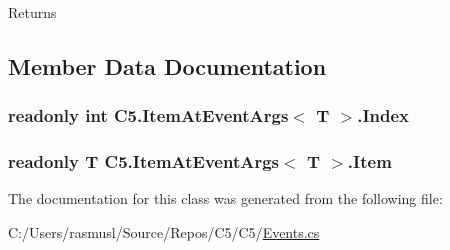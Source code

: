 \begin{DoxyReturn}{Returns}

\end{DoxyReturn}


\subsection{Member Data Documentation}
\hypertarget{class_c5_1_1_item_at_event_args_a6e28d2322e9f3a0b938763edf392a5d6}{}
\subsubsection[{Index}]{\setlength{\rightskip}{0pt plus 5cm}readonly int {\bf C5.\+Item\+At\+Event\+Args}$<$ T $>$.Index}\label{class_c5_1_1_item_at_event_args_a6e28d2322e9f3a0b938763edf392a5d6}




\hypertarget{class_c5_1_1_item_at_event_args_ac031819eac1e4dd6b870ec19ab0ad537}{}
\subsubsection[{Item}]{\setlength{\rightskip}{0pt plus 5cm}readonly T {\bf C5.\+Item\+At\+Event\+Args}$<$ T $>$.Item}\label{class_c5_1_1_item_at_event_args_ac031819eac1e4dd6b870ec19ab0ad537}






The documentation for this class was generated from the following file\+:\begin{DoxyCompactItemize}
\item 
C\+:/\+Users/rasmusl/\+Source/\+Repos/\+C5/\+C5/\hyperlink{_events_8cs}{Events.\+cs}\end{DoxyCompactItemize}
